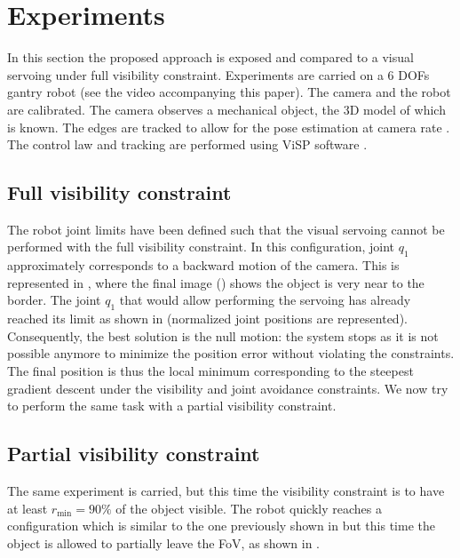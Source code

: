 \documentclass[letterpaper, 10 pt, conference]{IEEEtran}  %
\begin{document}
\section{Experiments}\label{sec:exp}

In this section the proposed approach is exposed and compared to a visual servoing under full visibility constraint.
Experiments are carried on a 6 DOFs gantry robot (see the video accompanying this paper).
The camera and the robot are calibrated. The camera observes a mechanical object, the 3D model of which is known.
The edges are tracked to allow for the pose estimation at camera rate \cite{Comport05b}. 
The control law and tracking are performed using ViSP software \cite{Marchand05b}.

\subsection{Full visibility constraint}

The robot joint limits have been defined such that
the visual servoing cannot be performed with the full visibility constraint. In this configuration, joint $q_1$ approximately corresponds to a backward motion of the camera. 
This is represented in , where the final image () shows the object is very near to the border. 
The joint $q_1$ that would allow performing the servoing has already reached its limit as shown in  %
(normalized joint positions are represented).
Consequently, the best solution is the null motion: the system stops as it is not possible anymore to minimize the position error without violating the constraints. The final position is thus the local minimum corresponding to the steepest gradient descent under the visibility and joint avoidance constraints.
We now try to perform the same task with a partial visibility constraint.


\subsection{Partial visibility constraint}

The same experiment is carried, but this time the visibility constraint is to have at least $r_{\text{min}} = 90\%$ of the object visible. 
The robot quickly reaches a configuration which is similar to the one previously shown in  but this time the object is allowed to partially leave the FoV, as shown in .
\end{document}
